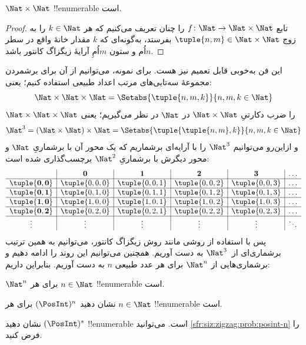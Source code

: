 \documentclass[../../../include/open-logic-section]{subfiles}
\begin{document}
\begin{prop}
$\Nat \times \Nat$ !!{enumerable} است.
\end{prop}

\begin{proof}
تابع $f \colon \Nat \to \Nat\times\Nat$ را چنان تعریف می‌کنیم که هر
$k \in \Nat$ را به زوج $\tuple{n,m} \in \Nat \times \Nat$ بفرستد،
به‌گونه‌ای که $k$
مقدار خانهٔ واقع در سطر $n$اُم و ستون $m$اُمِ آرایهٔ زیگزاگ کانتور باشد.
\end{proof}

\begin{explain}
این فن به‌خوبی قابل تعمیم نیز هست. برای نمونه، می‌توانیم از آن برای
برشمردن مجموعهٔ سه‌تایی‌های مرتب اعداد طبیعی استفاده کنیم؛ یعنی:
\[
\Nat \times \Nat \times \Nat = \Setabs{\tuple{n,m,k}}{n,m,k \in \Nat}
\]
$\Nat \times \Nat \times \Nat$ را ضرب دکارتیِ
$\Nat \times \Nat$ در $\Nat$ در نظر می‌گیریم؛ یعنی
\[
\Nat^3 = (\Nat \times \Nat) \times \Nat =
\Setabs{\tuple{\tuple{n,m},k}}{n, m, k
  \in \Nat }
\]
و ازاین‌رو می‌توانیم $\Nat^3$ را با آرایه‌ای برشماریم که یک محور آن
با برشماریِ $\Nat$ و محور دیگرش با برشماریِ $\Nat^2$ برچسب‌گذاری شده است:
\[
\begin{array}{ c | c | c | c | c | c}
& \mathbf 0 & \mathbf 1 & \mathbf 2 & \mathbf 3 & \dots \\
\hline
\mathbf{\tuple{0,0}} & \tuple{0,0,0} & \tuple{0,0,1} & \tuple{0,0,2} & \tuple{0,0,3} & \dots \\
\hline
\mathbf{\tuple{0,1}} & \tuple{0,1,0} & \tuple{0,1,1} & \tuple{0,1,2} & \tuple{0,1,3} & \dots \\
\hline
\mathbf{\tuple{1,0}} & \tuple{1,0,0} & \tuple{1,0,1} & \tuple{1,0,2} & \tuple{1,0,3} & \dots \\
\hline
\mathbf{\tuple{0,2}} & \tuple{0,2,0} & \tuple{0,2,1} & \tuple{0,2,2} & \tuple{0,2,3} & \dots\\
\hline
\vdots & \vdots & \vdots & \vdots & \vdots & \ddots \\
\end{array}
\]
پس با استفاده از روشی مانند روش زیگزاگ کانتور، می‌توانیم به همین ترتیب
برشماری‌ای از~$\Nat^3$ به دست آوریم. همچنین می‌توانیم این روند را ادامه
دهیم و برشماری‌هایی از $\Nat^n$ برای هر عدد طبیعی $n$ به دست آوریم.
بنابراین داریم:
\end{explain}

\begin{prop}
$\Nat^n$ برای هر $n \in \Nat$ !!{enumerable} است.
\end{prop}

\begin{prob}\label{sfr:siz:zigzag:prob:posint-n}
نشان دهید $(\PosInt)^n$ برای هر $n \in \Nat$ !!{enumerable} است.
\end{prob}

\begin{prob}\label{sfr:siz:zigzag:prob:posint-star}
  نشان دهید $(\PosInt)^*$ !!{enumerable} است. می‌توانید
  \cref{sfr:siz:zigzag:prob:posint-n} را فرض کنید.
\end{prob}
\end{document}
